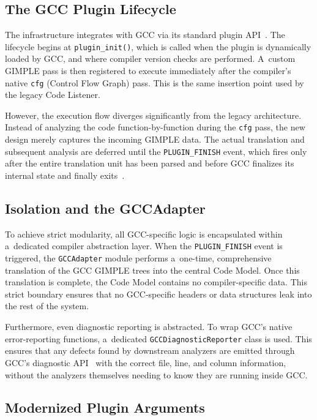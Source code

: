 \documentclass[xpsejal00-gcc-plugin.tex]{subfiles}
\begin{document}
\subsection*{The GCC Plugin Lifecycle}\label{sub:plugin-lifecycle}

The infrastructure integrates with GCC via its standard plugin API~\cite{GCCInternals}.\@
The lifecycle begins at \texttt{plugin\_init()}, which is called when the plugin is dynamically loaded by GCC, and where compiler version checks are performed.
A~custom GIMPLE pass is then registered to execute immediately after the compiler's native \texttt{cfg} (Control Flow Graph) pass.
This is the same insertion point used by the legacy Code Listener.

However, the execution flow diverges significantly from the legacy architecture.
Instead of analyzing the code function-by-function during the \texttt{cfg} pass, the new design merely captures the incoming GIMPLE data.
The actual translation and subsequent analysis are deferred until the \texttt{PLUGIN\_FINISH} event, which fires only after the entire translation unit has been parsed and before GCC finalizes its internal state and finally exits~\cite{GCCInternals}.

\subsection*{Isolation and the GCCAdapter}\label{sub:gcc-adapter}

To achieve strict modularity, all GCC-specific logic is encapsulated within a~dedicated compiler abstraction layer.
When the \texttt{PLUGIN\_FINISH} event is triggered, the \texttt{GCCAdapter} module performs a~one-time, comprehensive translation of the GCC GIMPLE trees into the central Code Model.
Once this translation is complete, the Code Model contains no compiler-specific data.
This strict boundary ensures that no GCC-specific headers or data structures leak into the rest of the system.

Furthermore, even diagnostic reporting is abstracted.
To wrap GCC's native error-reporting functions, a~dedicated \texttt{GCCDiagnosticReporter} class is used.
This ensures that any defects found by downstream analyzers are emitted through GCC's diagnostic API~\cite{GCCInternals} with the correct file, line, and column information, without the analyzers themselves needing to know they are running inside GCC.\@

\subsection*{Modernized Plugin Arguments}\label{sub:plugin-arguments}
\end{document}
